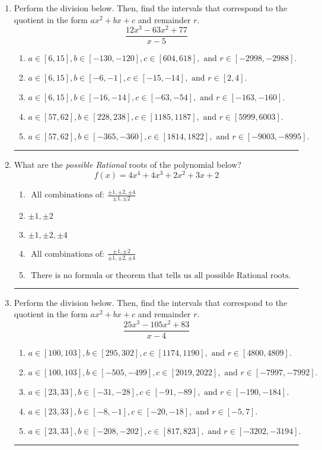 \documentclass[14pt]{extbook}
\newcommand{\litem}[1]{\item#1\hspace*{-1cm}\rule{\textwidth}{0.4pt}}
\begin{document}
\begin{enumerate}
\litem{
Perform the division below. Then, find the intervals that correspond to the quotient in the form $ax^2+bx+c$ and remainder $r$.\[ \frac{12x^{3} -63 x^{2} + 77}{x -5} \]\begin{enumerate}[label=\Alph*.]
\item \( a \in [6, 15], b \in [-130, -120], c \in [604, 618], \text{ and } r \in [-2998, -2988]. \)
\item \( a \in [6, 15], b \in [-6, -1], c \in [-15, -14], \text{ and } r \in [2, 4]. \)
\item \( a \in [6, 15], b \in [-16, -14], c \in [-63, -54], \text{ and } r \in [-163, -160]. \)
\item \( a \in [57, 62], b \in [228, 238], c \in [1185, 1187], \text{ and } r \in [5999, 6003]. \)
\item \( a \in [57, 62], b \in [-365, -360], c \in [1814, 1822], \text{ and } r \in [-9003, -8995]. \)

\end{enumerate} }
\litem{
What are the \textit{possible Rational} roots of the polynomial below?\[ f(x) = 4x^{4} +4 x^{3} +2 x^{2} +3 x + 2 \]\begin{enumerate}[label=\Alph*.]
\item \( \text{ All combinations of: }\frac{\pm 1,\pm 2,\pm 4}{\pm 1,\pm 2} \)
\item \( \pm 1,\pm 2 \)
\item \( \pm 1,\pm 2,\pm 4 \)
\item \( \text{ All combinations of: }\frac{\pm 1,\pm 2}{\pm 1,\pm 2,\pm 4} \)
\item \( \text{ There is no formula or theorem that tells us all possible Rational roots.} \)

\end{enumerate} }
\litem{
Perform the division below. Then, find the intervals that correspond to the quotient in the form $ax^2+bx+c$ and remainder $r$.\[ \frac{25x^{3} -105 x^{2} + 83}{x -4} \]\begin{enumerate}[label=\Alph*.]
\item \( a \in [100, 103], b \in [295, 302], c \in [1174, 1190], \text{ and } r \in [4800, 4809]. \)
\item \( a \in [100, 103], b \in [-505, -499], c \in [2019, 2022], \text{ and } r \in [-7997, -7992]. \)
\item \( a \in [23, 33], b \in [-31, -28], c \in [-91, -89], \text{ and } r \in [-190, -184]. \)
\item \( a \in [23, 33], b \in [-8, -1], c \in [-20, -18], \text{ and } r \in [-5, 7]. \)
\item \( a \in [23, 33], b \in [-208, -202], c \in [817, 823], \text{ and } r \in [-3202, -3194]. \)


\end{enumerate}}
\end{enumerate}
\end{document}
